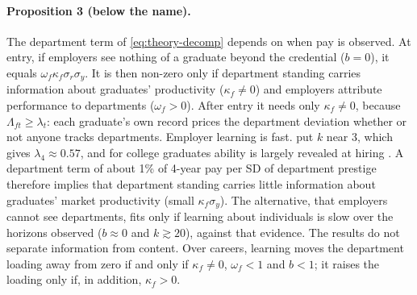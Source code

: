 \paragraph{Proposition 3 (below the name).} The department term of \eqref{eq:theory-decomp} depends on when
pay is observed. At entry, if employers see nothing of a graduate beyond the credential ($b=0$), it equals
$\omega_f\kappa_f\sigma_r\sigma_y$. It is then non-zero only if department standing carries information about
graduates' productivity ($\kappa_f\neq0$) and employers attribute performance to departments ($\omega_f>0$).
After entry it needs only $\kappa_f\neq0$, because $\Lambda_{ft}\ge\lambda_t$: each graduate's own record prices
the department deviation whether or not anyone tracks departments. Employer learning is fast.
\citet{lange2007speed} put $k$ near 3, which gives $\lambda_4\approx0.57$, and for college graduates ability is
largely revealed at hiring \citep{arcidiacono2010beyond}. A department term of about 1\% of 4-year pay per
SD of department prestige therefore implies that department standing carries little information about
graduates' market productivity (small $\kappa_f\sigma_y$). The alternative, that employers cannot see
departments, fits only if learning about individuals is slow over the horizons observed ($b\approx0$ and
$k\gtrsim20$), against that evidence. The results do not separate information from content. Over careers,
learning moves the department loading away from zero if and only if $\kappa_f\neq0$, $\omega_f<1$ and $b<1$; it
raises the loading only if, in addition, $\kappa_f>0$.

